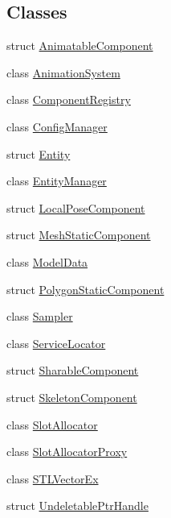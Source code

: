 \subsection*{Classes}
\begin{DoxyCompactItemize}
\item 
struct \mbox{\hyperlink{structnabla_1_1_animatable_component}{Animatable\+Component}}
\item 
class \mbox{\hyperlink{classnabla_1_1_animation_system}{Animation\+System}}
\item 
class \mbox{\hyperlink{classnabla_1_1_component_registry}{Component\+Registry}}
\item 
class \mbox{\hyperlink{classnabla_1_1_config_manager}{Config\+Manager}}
\item 
struct \mbox{\hyperlink{structnabla_1_1_entity}{Entity}}
\item 
class \mbox{\hyperlink{classnabla_1_1_entity_manager}{Entity\+Manager}}
\item 
struct \mbox{\hyperlink{structnabla_1_1_local_pose_component}{Local\+Pose\+Component}}
\item 
struct \mbox{\hyperlink{structnabla_1_1_mesh_static_component}{Mesh\+Static\+Component}}
\item 
class \mbox{\hyperlink{classnabla_1_1_model_data}{Model\+Data}}
\item 
struct \mbox{\hyperlink{structnabla_1_1_polygon_static_component}{Polygon\+Static\+Component}}
\item 
class \mbox{\hyperlink{classnabla_1_1_sampler}{Sampler}}
\item 
class \mbox{\hyperlink{classnabla_1_1_service_locator}{Service\+Locator}}
\item 
struct \mbox{\hyperlink{structnabla_1_1_sharable_component}{Sharable\+Component}}
\item 
struct \mbox{\hyperlink{structnabla_1_1_skeleton_component}{Skeleton\+Component}}
\item 
class \mbox{\hyperlink{classnabla_1_1_slot_allocator}{Slot\+Allocator}}
\item 
class \mbox{\hyperlink{classnabla_1_1_slot_allocator_proxy}{Slot\+Allocator\+Proxy}}
\item 
class \mbox{\hyperlink{classnabla_1_1_s_t_l_vector_ex}{S\+T\+L\+Vector\+Ex}}
\item 
struct \mbox{\hyperlink{structnabla_1_1_undeletable_ptr_handle}{Undeletable\+Ptr\+Handle}}
\end{DoxyCompactItemize}
